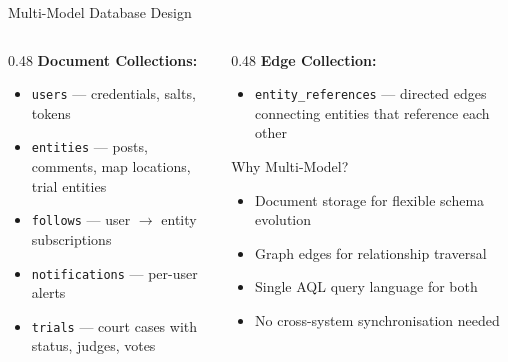 \documentclass[aspectratio=169,11pt]{beamer}
\begin{document}
\begin{frame}{Multi-Model Database Design}
  \begin{columns}[T]
    \begin{column}{0.48\textwidth}
      \textbf{Document Collections:}
      \begin{itemize}
        \item \texttt{users} --- credentials, salts, tokens
        \item \texttt{entities} --- posts, comments, map locations, trial entities
        \item \texttt{follows} --- user $\rightarrow$ entity subscriptions
        \item \texttt{notifications} --- per-user alerts
        \item \texttt{trials} --- court cases with status, judges, votes
      \end{itemize}
    \end{column}
    \begin{column}{0.48\textwidth}
      \textbf{Edge Collection:}
      \begin{itemize}
        \item \texttt{entity\_references} --- directed edges
              connecting entities that reference each other
      \end{itemize}
      \vspace{0.5em}
      \begin{block}{Why Multi-Model?}
        \begin{itemize}
          \item Document storage for flexible schema evolution
          \item Graph edges for relationship traversal
          \item Single AQL query language for both
          \item No cross-system synchronisation needed
        \end{itemize}
      \end{block}
    \end{column}
  \end{columns}
\end{frame}
\end{document}
